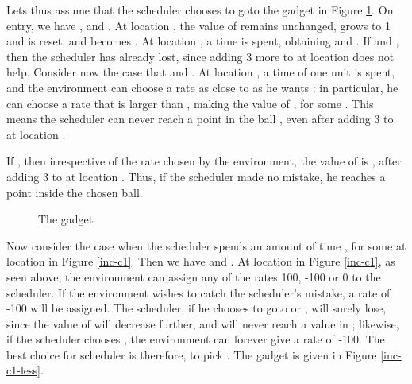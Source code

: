 \begin{enumerate}
Lets thus assume that the scheduler chooses to goto the gadget  in Figure \ref{inc-c1-more}. 
On entry, we have ,  and . 
At location , the value of  remains unchanged,  grows to 1 and is reset, 
and  becomes . At location , a 
time  is spent, obtaining  
and .
If  and , then the scheduler has already lost, since 
adding 3 more to  at location  does not help.  
Consider now the case that  and . 
At location , a time  of one unit is spent, and the environment can choose a 
rate as close to  as he wants : in particular, he can choose a rate 
that is larger than , making the value of , for some 
. This means the scheduler 
can never reach a point in the ball , 
even after adding 3 to  at location . 

If , then irrespective of the rate  chosen by the environment, 
the value of  is , after adding 3 to  at location . 
Thus, if the scheduler made no mistake, 
he reaches a point inside the chosen ball.  





\begin{figure}[h]
\begin{center}
\caption{The gadget }
\label{inc-c1-more}
\end{center}
\end{figure}

Now consider the case when the scheduler spends an amount of time , 
for some  at location  in Figure \ref{inc-c1}. Then we have 
 and . At location  in Figure \ref{inc-c1}, as 
seen above, the environment can assign any of the rates 100, -100 or 0 to the scheduler.
If the environment wishes to catch the scheduler's mistake, a rate of -100 will be assigned. The scheduler, 
if he chooses to goto  or , will surely lose, since 
the value of  will decrease further, and will never reach a value in ; 
likewise, if the scheduler chooses , the environment can forever give a rate of -100. 
The best choice for scheduler is therefore, to pick . The gadget  is 
given in Figure \ref{inc-c1-less}.  
 

\end{enumerate}
